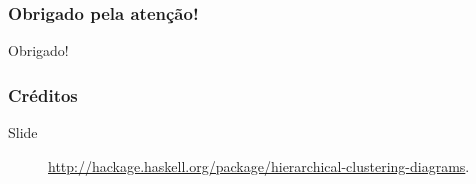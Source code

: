 \appendix

\begin{frame}
  \frametitle{Obrigado pela atenção!}
  \begin{center}
    {\Huge Obrigado!}
  \end{center}
\end{frame}

\begin{frame}[allowframebreaks]
  \frametitle{Créditos}
  \begin{description}
  \item[Slide~\pageref{fig:exemplo}]
    \url{http://hackage.haskell.org/package/hierarchical-clustering-diagrams}.
  \end{description}
\end{frame}
